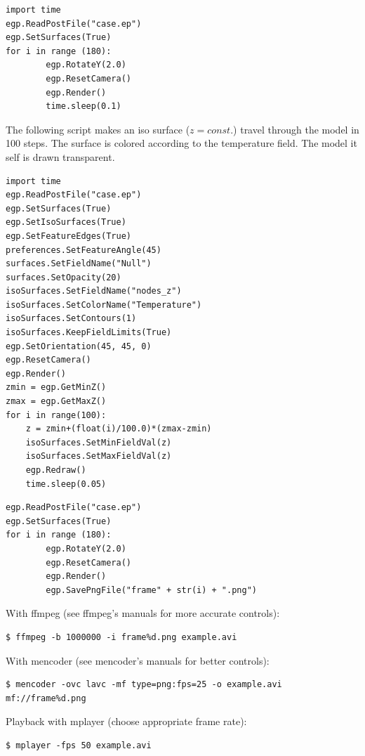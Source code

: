 \documentclass[a4paper,12pt]{article}
\begin{document}
\vskip5mm
\begin{footnotesize}
\begin{verbatim}
import time
egp.ReadPostFile("case.ep")
egp.SetSurfaces(True)
for i in range (180):
        egp.RotateY(2.0)
        egp.ResetCamera()
        egp.Render()
        time.sleep(0.1)
\end{verbatim}
\end{footnotesize}


\vskip5mm
\vskip5mm
\noindent The following script makes an iso surface ($z=const.$) travel through the model
in 100 steps. The surface is colored according to the temperature field. The model it self
is drawn transparent.
\begin{footnotesize}
\begin{verbatim}
import time
egp.ReadPostFile("case.ep")
egp.SetSurfaces(True)
egp.SetIsoSurfaces(True)
egp.SetFeatureEdges(True)
preferences.SetFeatureAngle(45)
surfaces.SetFieldName("Null")
surfaces.SetOpacity(20)
isoSurfaces.SetFieldName("nodes_z")
isoSurfaces.SetColorName("Temperature")
isoSurfaces.SetContours(1)
isoSurfaces.KeepFieldLimits(True)
egp.SetOrientation(45, 45, 0)
egp.ResetCamera()
egp.Render()
zmin = egp.GetMinZ()
zmax = egp.GetMaxZ()
for i in range(100):
    z = zmin+(float(i)/100.0)*(zmax-zmin)
    isoSurfaces.SetMinFieldVal(z)
    isoSurfaces.SetMaxFieldVal(z)
    egp.Redraw()
    time.sleep(0.05)
\end{verbatim}
\end{footnotesize}


\vskip5mm
\begin{footnotesize}
\begin{verbatim}
egp.ReadPostFile("case.ep")
egp.SetSurfaces(True)
for i in range (180):
        egp.RotateY(2.0)
        egp.ResetCamera()
        egp.Render()
        egp.SavePngFile("frame" + str(i) + ".png")
\end{verbatim}
\end{footnotesize}

\vskip5mm

\vskip5mm

\noindent With ffmpeg (see ffmpeg's manuals for more accurate controls):
\begin{footnotesize}
\begin{verbatim}
$ ffmpeg -b 1000000 -i frame%d.png example.avi
\end{verbatim}
\end{footnotesize}
With mencoder (see mencoder's manuals for better controls):
\begin{footnotesize}
\begin{verbatim}
$ mencoder -ovc lavc -mf type=png:fps=25 -o example.avi mf://frame%d.png
\end{verbatim}
\end{footnotesize}
Playback with mplayer (choose appropriate frame rate):
\begin{footnotesize}
\begin{verbatim}
$ mplayer -fps 50 example.avi
\end{verbatim}
\end{footnotesize}
\end{document}
